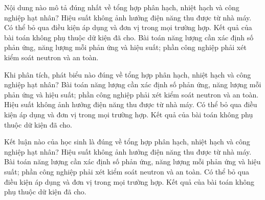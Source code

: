 \begin{ex}
Nội dung nào mô tả đúng nhất về tổng hợp phân hạch, nhiệt hạch và công nghiệp hạt nhân?
\choice
{Hiệu suất không ảnh hưởng điện năng thu được từ nhà máy.}
{Có thể bỏ qua điều kiện áp dụng và đơn vị trong mọi trường hợp.}
{Kết quả của bài toán không phụ thuộc dữ kiện đã cho.}
{\True Bài toán năng lượng cần xác định số phản ứng, năng lượng mỗi phản ứng và hiệu suất; phần công nghiệp phải xét kiểm soát neutron và an toàn.}
\end{ex}

\begin{ex}
Khi phân tích, phát biểu nào đúng về tổng hợp phân hạch, nhiệt hạch và công nghiệp hạt nhân?
\choice
{\True Bài toán năng lượng cần xác định số phản ứng, năng lượng mỗi phản ứng và hiệu suất; phần công nghiệp phải xét kiểm soát neutron và an toàn.}
{Hiệu suất không ảnh hưởng điện năng thu được từ nhà máy.}
{Có thể bỏ qua điều kiện áp dụng và đơn vị trong mọi trường hợp.}
{Kết quả của bài toán không phụ thuộc dữ kiện đã cho.}
\end{ex}

\begin{ex}
Kết luận nào của học sinh là đúng về tổng hợp phân hạch, nhiệt hạch và công nghiệp hạt nhân?
\choice
{Hiệu suất không ảnh hưởng điện năng thu được từ nhà máy.}
{\True Bài toán năng lượng cần xác định số phản ứng, năng lượng mỗi phản ứng và hiệu suất; phần công nghiệp phải xét kiểm soát neutron và an toàn.}
{Có thể bỏ qua điều kiện áp dụng và đơn vị trong mọi trường hợp.}
{Kết quả của bài toán không phụ thuộc dữ kiện đã cho.}
\end{ex}

